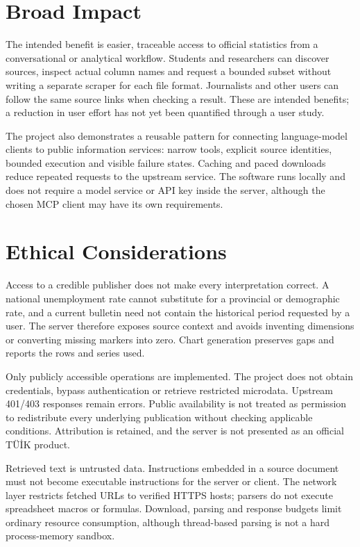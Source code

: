 \documentclass[a4paper,12pt]{report}
\newcommand{\tuik}{T\"U\.{I}K}
\begin{document}
\section{Broad Impact}
The intended benefit is easier, traceable access to official statistics from a conversational or analytical workflow. Students and researchers can discover sources, inspect actual column names and request a bounded subset without writing a separate scraper for each file format. Journalists and other users can follow the same source links when checking a result. These are intended benefits; a reduction in user effort has not yet been quantified through a user study.

The project also demonstrates a reusable pattern for connecting language-model clients to public information services: narrow tools, explicit source identities, bounded execution and visible failure states. Caching and paced downloads reduce repeated requests to the upstream service. The software runs locally and does not require a model service or API key inside the server, although the chosen MCP client may have its own requirements.

\section{Ethical Considerations}
Access to a credible publisher does not make every interpretation correct. A national unemployment rate cannot substitute for a provincial or demographic rate, and a current bulletin need not contain the historical period requested by a user. The server therefore exposes source context and avoids inventing dimensions or converting missing markers into zero. Chart generation preserves gaps and reports the rows and series used.

Only publicly accessible operations are implemented. The project does not obtain credentials, bypass authentication or retrieve restricted microdata. Upstream 401/403 responses remain errors. Public availability is not treated as permission to redistribute every underlying publication without checking applicable conditions. Attribution is retained, and the server is not presented as an official \tuik{} product.

Retrieved text is untrusted data. Instructions embedded in a source document must not become executable instructions for the server or client. The network layer restricts fetched URLs to verified HTTPS hosts; parsers do not execute spreadsheet macros or formulas. Download, parsing and response budgets limit ordinary resource consumption, although thread-based parsing is not a hard process-memory sandbox.
\end{document}
